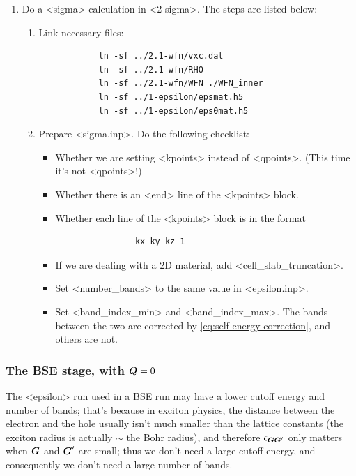 \documentclass[hyperref, a4paper, 12pt]{report}
\def\texttt#1{<#1>}%
\newcommand{\shortcode}[1]{\texttt{#1}}
\begin{document}
\begin{enumerate}
\begin{enumerate}
    \end{enumerate}
    \item Do a \shortcode{sigma} calculation in \shortcode{2-sigma}. The steps are listed below:
    \begin{enumerate}
        \item Link necessary files:
        \begin{lstlisting}
            ln -sf ../2.1-wfn/vxc.dat 
            ln -sf ../2.1-wfn/RHO 
            ln -sf ../2.1-wfn/WFN ./WFN_inner
            ln -sf ../1-epsilon/epsmat.h5 
            ln -sf ../1-epsilon/eps0mat.h5 
        \end{lstlisting}
        \item Prepare \shortcode{sigma.inp}. Do the following checklist:
        \begin{itemize}
            \item Whether we are setting \shortcode{kpoints} instead of \shortcode{qpoints}.
            (This time it's not \shortcode{qpoints}!)
            \item Whether there is an \shortcode{end} line of the \shortcode{kpoints} block.
            \item Whether each line of the \shortcode{kpoints} block is in the format
            \begin{lstlisting}
                kx ky kz 1
            \end{lstlisting}
            \item If we are dealing with a 2D material, add \shortcode{cell_slab_truncation}.
            \item Set \shortcode{number_bands} to the same value in \shortcode{epsilon.inp}.
            \item Set \shortcode{band_index_min} and \shortcode{band_index_max}.
            The bands between the two are corrected by \eqref{eq:self-energy-correction},
            and others are not.
        \end{itemize}
    \end{enumerate}
\end{enumerate}

\subsubsection{The BSE stage, with $\vb*{Q} = 0$}

The \shortcode{epsilon} run used in a BSE run may have a lower cutoff energy and number of bands;
that's because in exciton physics, the distance between the electron and the hole 
usually isn't much smaller than the lattice constants
(the exciton radius is actually $\sim$ the Bohr radius), 
and therefore $\epsilon_{\vb*{G} \vb*{G}'}$ only matters when $\vb*{G}$ and $\vb*{G}'$ are small; 
thus we don't need a large cutoff energy, 
and consequently we don't need a large number of bands. 
\end{document}
